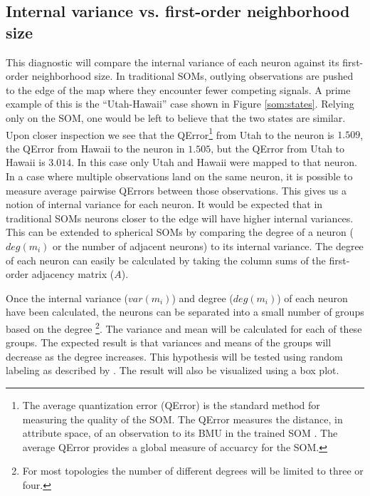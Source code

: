 \subsection{Internal variance vs. first-order neighborhood size}
\label{q1}
This diagnostic will compare the internal variance of each neuron against its
first-order neighborhood size.  In traditional SOMs, outlying observations are
pushed to the edge of the map where they encounter fewer competing signals. A
prime example of this is the ``Utah-Hawaii'' case shown in Figure
\ref{som:states}.  Relying only on the SOM, one would be left to believe that the
two states are similar.  Upon closer inspection we see that the
QError\footnote{The average quantization error (QError) is the standard method for
measuring the quality of the SOM.  The QError measures the distance, in
attribute space, of an observation to its BMU in the trained SOM
\citep{Kohonen2000}. The average QError provides a global measure of accuarcy
for the SOM.} from Utah to the neuron is $1.509$, the QError from Hawaii to
the neuron in $1.505$, but the QError from Utah to Hawaii is $3.014$. In this
case only Utah and Hawaii were mapped to that neuron.  In a case where
multiple observations land on the same neuron, it is possible to measure
average pairwise QErrors between those observations.  This gives us a notion
of internal variance for each neuron. It would be expected that in traditional
SOMs neurons closer to the edge will have higher internal variances. This can
be extended to spherical SOMs by comparing the degree of a neuron ($deg(m_i)$
or the number of adjacent neurons) to its internal variance.  The degree of
each neuron can easily be calculated by taking the column sums of the
first-order adjacency matrix ($A$).

Once the internal variance ($var(m_i)$) and degree ($deg(m_i)$) of each neuron
have been calculated, the neurons can be separated into a small number of
groups based on the degree \footnote{For most topologies the number of
different degrees will be limited to three or four.}.  The variance and mean
will be calculated for each of these groups.  The expected result is that
variances and means of the groups will decrease as the degree increases.  This
hypothesis will be tested using random labeling as described by \cite{siss2004}.
The result will also be visualized using a box plot.

